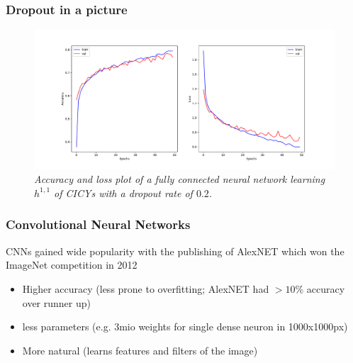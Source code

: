 \documentclass{beamer}
\begin{document}
\begin{frame}
\frametitle{Dropout in a picture}
\begin{figure}
	\centering
	\includegraphics[scale=0.33]{cicy_dropout.pdf}
	\caption{\it Accuracy and loss plot of a fully connected neural network learning $h^{1,1}$ of CICYs with a dropout rate of $0.2$.}
\end{figure}
\end{frame}

\begin{frame}
\frametitle{Convolutional Neural Networks}

CNNs gained wide popularity with the publishing of AlexNET which won the ImageNet competition in 2012
\begin{itemize}
	\item Higher accuracy (less prone to overfitting; AlexNET had $>10\%$ accuracy over runner up)
	\item less parameters (e.g. 3mio weights for single dense neuron in 1000x1000px)
	\item More natural (learns features and filters of the image)
\end{itemize}
\end{frame}
\end{document}
